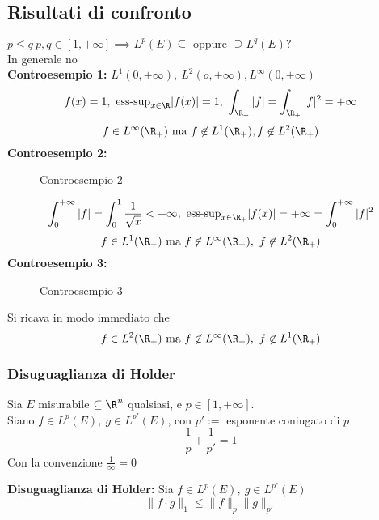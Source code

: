 \subsection{Risultati di confronto}
$p\le q\ p,q\in[1,+\infty]\implies  L^p(E)\subseteq \text{ oppure }\supseteq L^q(E)?$
\\In generale no
\\\textbf{Controesempio 1:} $L^1(0,+\infty), \ L^2(o,+\infty),L^\infty(0,+\infty)$
\[f(x)=1,\ \text{ess-sup}_{x\in\R}|f(x)|=1,\ \int_{\R_+}^{} |f|=\int_{\R_+}^{} |f|^2=+\infty\]  
\[f\in L^{\infty}(\R_+)\text{ ma }f\not\in L^1(\R_+),f\not\in L^2(\R_+)\]
\textbf{Controesempio 2:} 
\begin{figure}[ht]
    \centering
    \caption{Controesempio 2}
    \label{fig:esempio2}
\end{figure}
\[\int_{0}^{+\infty} |f|=\int_{0}^{1} \frac{1}{\sqrt{x} }<+\infty,\ \text{ess-sup}_{x\in\R_+}|f(x)|=+\infty=\int_{0}^{+\infty}|f|^2\]
\[f\in L^1(\R_+)\text{ ma }f\not\in L^\infty(\R_+),\ f\not\in L^2(\R_+)\]
\textbf{Controesempio 3:} 
\begin{figure}[ht]
    \centering
    \caption{Controesempio 3}
    \label{fig:controesempio3}
\end{figure}
Si ricava in modo immediato che 
\[f\in L^2(\R_+)\text{ ma }f\not\in L^\infty(\R_+),\ f\not\in L^1(\R_+)\]
\subsubsection{Disuguaglianza di Holder}
\begin{tcolorbox}
	Sia $E$ misurabile $\subseteq \R^n$ qualsiasi, e $p \in [1,+\infty]$.
	\\Siano $f\in L^p(E),\ g\in L^{p'}(E)$, con $p':=$ esponente coniugato di $p$
	\[\frac{1}{p}+\frac{1}{p'}=1\]
	Con la convenzione $\frac{1}{\infty}=0$ 
\end{tcolorbox}
\begin{tcolorbox}
	\textbf{Disuguaglianza di Holder: }Sia $f\in L^p(E),\ g\in L^{p'}(E)$
	\[\|f\cdot g\|_1\le \|f\|_p\|g\|_{p'}\]
\end{tcolorbox}
